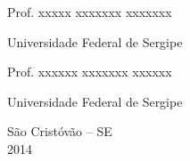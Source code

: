 \begin{titlepage}
\begin{center}
        \centerline{\underline{ }\underline{ }\underline{ }\underline{ }\underline{ }\underline{ }\underline{ }\underline{ }\underline{ }\underline{ }\underline{ }\underline{ }\underline{ }\underline{ }\underline{ }\underline{ }\underline{ }\underline{ }\underline{ }\underline{ }\underline{ }\underline{ }\underline{ }\underline{ }\underline{ }\underline{ }\underline{ }\underline{ }\underline{ }\underline{ }\underline{ }\underline{ }\underline{ }\underline{ }\underline{ }\underline{ }\underline{ }\underline{ }\underline{ }\underline{ }\underline{ }\underline{ }\underline{ }\underline{ }\underline{ }\underline{ }\underline{ }\underline{ }\underline{ }\underline{ }\underline{ }\underline{ }\underline{ }\underline{ }\underline{ }\underline{ }\underline{ }\underline{ }\underline{ }\underline{ }\underline{ }\underline{ }\underline{ }\underline{ }\underline{ }\underline{ }\underline{ }\underline{ }\underline{ }\underline{ }\underline{ }\underline{ }\underline{ }\underline{ }\underline{ }\underline{ }\underline{ }}
        \centerline{Prof. xxxxx xxxxxxx xxxxxxx}
        \centerline{Universidade Federal de Sergipe}
        \centerline{}

        \centerline{\underline{ }\underline{ }\underline{ }\underline{ }\underline{ }\underline{ }\underline{ }\underline{ }\underline{ }\underline{ }\underline{ }\underline{ }\underline{ }\underline{ }\underline{ }\underline{ }\underline{ }\underline{ }\underline{ }\underline{ }\underline{ }\underline{ }\underline{ }\underline{ }\underline{ }\underline{ }\underline{ }\underline{ }\underline{ }\underline{ }\underline{ }\underline{ }\underline{ }\underline{ }\underline{ }\underline{ }\underline{ }\underline{ }\underline{ }\underline{ }\underline{ }\underline{ }\underline{ }\underline{ }\underline{ }\underline{ }\underline{ }\underline{ }\underline{ }\underline{ }\underline{ }\underline{ }\underline{ }\underline{ }\underline{ }\underline{ }\underline{ }\underline{ }\underline{ }\underline{ }\underline{ }\underline{ }\underline{ }\underline{ }\underline{ }\underline{ }\underline{ }\underline{ }\underline{ }\underline{ }\underline{ }\underline{ }\underline{ }\underline{ }\underline{ }\underline{ }\underline{ }}
        \centerline{Prof. xxxxxx xxxxxxx xxxxxx}
        \centerline{Universidade Federal de Sergipe}
        \centerline{}

        \vfill
        {\large S\~ao Crist\'ov\~ao -- SE} \\
        {\large 2014}
    \end{center}
\end{titlepage}
\pagebreak

